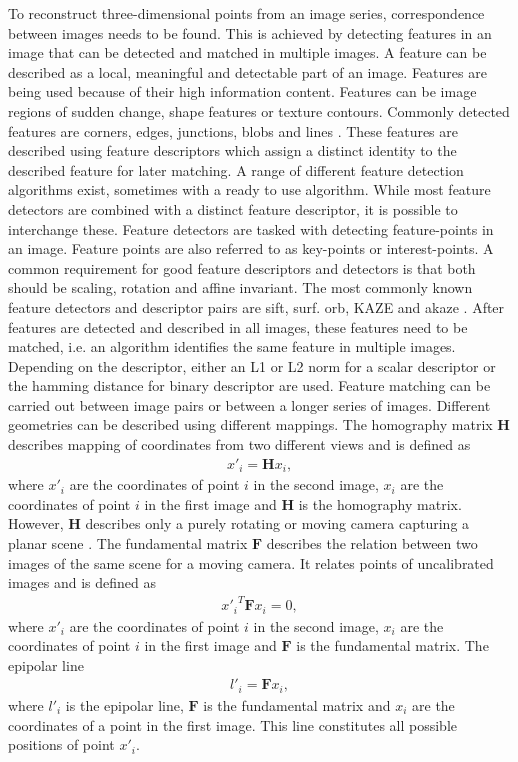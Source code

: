 To reconstruct three-dimensional points from an image series, correspondence between images needs to be found. This is achieved by detecting features in an image that can be detected and matched in multiple images. A feature can be described as a local, meaningful and detectable part of an image. Features are being used because of their high information content. Features can be image regions of sudden change, shape features or texture contours. Commonly detected features are corners, edges, junctions, blobs and lines \cite{2018comparingfeatures}. These features are described using feature descriptors which assign a distinct identity to the described feature for later matching. A range of different feature detection algorithms  exist, sometimes with a ready to use algorithm. While most feature detectors are combined with a distinct feature descriptor, it is possible to interchange these. Feature detectors are tasked with detecting feature-points in an image. Feature points are also referred to as key-points or interest-points. A common requirement for good feature descriptors and detectors is that both should be scaling, rotation and affine invariant. The most commonly known feature detectors and descriptor pairs are \gls{sift}, \gls{surf}. \gls{orb}, KAZE and \gls{akaze} \cite{2018comparingfeatures}.
After features are detected and described in all images, these features need to be matched, i.e. an algorithm identifies the same feature in multiple images. Depending on the descriptor, either an L1 or L2 norm for a scalar descriptor or the hamming distance for binary descriptor are used. Feature matching can be carried out between image pairs or between a longer series of images. Different geometries can be described using different mappings. The homography matrix $\textbf{H}$ describes mapping of coordinates from two different views and is defined as
\begin{align}
    x'_i = \textbf{H}x_i, \label{eq:homography_m}
\end{align}
where $x'_i$ are the coordinates of point $i$ in the second image, $x_i$ are the coordinates of point $i$ in the first image and $\textbf{H}$ is the homography matrix. However, $\textbf{H}$ describes only a purely rotating or moving camera capturing a planar scene \cite{schonberger2016structure}.
The fundamental matrix $\textbf{F}$ describes the relation between two images of the same scene for a moving camera. It relates points of uncalibrated images and is defined as
\begin{align}
    {x'_i}^{T}\textbf{F}x_i = 0, \label{eq:fundamental_m}
\end{align}
where $x'_i$ are the coordinates of point $i$ in the second image, $x_i$ are the coordinates of point $i$ in the first image and $\textbf{F}$ is the fundamental matrix. The epipolar line
\begin{align}
    l'_i = \textbf{F}x_i, \label{eq:epipolar_l}
\end{align}
where $l'_i$ is the epipolar line, $\textbf{F}$ is the fundamental matrix and $x_i$ are the coordinates of a point in the first image. This line constitutes all possible positions of point $x'_i$.

